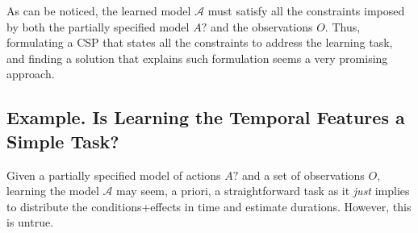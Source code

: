 \documentclass[10pt,journal,compsoc]{IEEEtran}
\newcommand{\tup}[1]{{\langle #1 \rangle}}
\newcommand{\obs}{\mathsf{obs}}    %
\begin{document}
As can be noticed, the learned model $\mathcal{A}$ must satisfy all the constraints imposed by both the partially specified model $A?$ and the observations $O$.
Thus, formulating a CSP that states all the constraints to address the learning task, and finding a solution that explains such formulation seems a
very promising approach.




\subsection{Example. Is Learning the Temporal Features a Simple Task?}
\label{sec:simpleTask}


Given a partially specified model of actions $A?$ and a set of observations $O$, learning the model $\mathcal{A}$ may seem, a priori, a straightforward task as it \emph{just} implies to distribute the conditions+effects in time and estimate durations. However, this is untrue.
\end{document}
